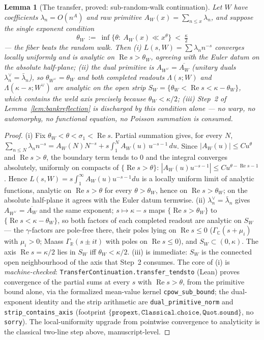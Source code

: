 \documentclass[11pt]{article}
\newtheorem{lemma}[theorem]{Lemma}
\theoremstyle{definition}
\renewcommand{\Re}{\operatorname{Re}}
\begin{document}
\begin{lemma}[The transfer, proved: sub-random-walk continuation]\label{lem:transfer}
Let $W$ have coefficients $\lambda_n=O(n^{A})$ and raw primitive $A_W(x)=\sum_{n\le x}\lambda_n$, and suppose
the single exponent condition
\[
  \theta_W\ :=\ \inf\{\theta:\ A_W(x)\ll x^{\theta}\}\ <\ \tfrac\kappa2
\]
--- \emph{the fiber beats the random walk}. Then \textup{(i)} $L(s,W)=\sum\lambda_n n^{-s}$ converges locally
uniformly and is analytic on $\Re s>\theta_W$, agreeing with the Euler datum on the absolute half-plane;
\textup{(ii)} the dual primitive is $A_{W^\vee}=\overline{A_W}$ (unitary duals $\lambda^\vee_n=
\bar\lambda_n$), so $\theta_{W^\vee}=\theta_W$ and \emph{both} completed readouts $\Lambda(s;W)$ and
$\Lambda(\kappa-s;W^\vee)$ are analytic on the open strip
$S_W=\{\theta_W<\Re s<\kappa-\theta_W\}$, which contains the weld axis precisely because
$\theta_W<\kappa/2$; \textup{(iii)} Step~2 of Lemma~\ref{lem:bankreflection} is discharged by this condition
alone --- no warp, no automorphy, no functional equation, no Poisson summation is consumed.
\end{lemma}
\begin{proof}
\textup{(i)} Fix $\theta_W<\theta<\sigma_1<\Re s$. Partial summation gives, for every $N$,
$\sum_{n\le N}\lambda_n n^{-s}=A_W(N)N^{-s}+s\int_1^{N}A_W(u)\,u^{-s-1}\,du$. Since $|A_W(u)|\le C u^{\theta}$
and $\Re s>\theta$, the boundary term tends to $0$ and the integral converges absolutely, uniformly on
compacts of $\{\Re s>\theta\}$: $|A_W(u)u^{-s-1}|\le C u^{\theta-\Re s-1}$. Hence
$L(s,W)=s\int_1^\infty A_W(u)u^{-s-1}du$ is a locally uniform limit of analytic functions, analytic on
$\Re s>\theta$ for every $\theta>\theta_W$, hence on $\Re s>\theta_W$; on the absolute half-plane it agrees
with the Euler datum termwise. \textup{(ii)} $\lambda^\vee_n=\bar\lambda_n$ gives $A_{W^\vee}=\overline{A_W}$
and the same exponent; $s\mapsto\kappa-s$ maps $\{\Re s>\theta_W\}$ to $\{\Re s<\kappa-\theta_W\}$, so both
factors of each completed readout are analytic on $S_W$ --- the $\gamma$-factors are pole-free there, their
poles lying on $\Re s\le0$ ($\Gamma_{\mathbb C}(s+\mu_i)$ with $\mu_i>0$; Maass $\Gamma_{\mathbb R}(s\pm it)$
with poles on $\Re s\le 0$), and $S_W\subset(0,\kappa)$. The axis $\Re s=\kappa/2$ lies in $S_W$ iff
$\theta_W<\kappa/2$. \textup{(iii)} is immediate: $S_W$ is the connected open neighbourhood of the axis that
Step~2 consumes.
The core of \textup{(i)} is \emph{machine-checked}: \texttt{TransferContinuation.transfer\_tendsto}
(Lean) proves convergence of the partial sums at every $s$ with $\Re s>\theta$, from the primitive
bound alone, via the formalized mean-value kernel \texttt{cpow\_sub\_bound}; the dual-exponent
identity and the strip arithmetic are \texttt{dual\_primitive\_norm} and
\texttt{strip\_contains\_axis} (footprint
$\{\texttt{propext},\texttt{Classical.choice},\texttt{Quot.sound}\}$, no \texttt{sorry}). The
local-uniformity upgrade from pointwise convergence to analyticity is the classical two-line step
above, manuscript-level.
\end{proof}
\end{document}
